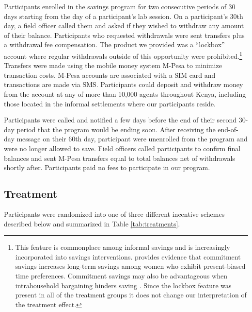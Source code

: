 \documentclass[12pt, titlepage]{article}
\begin{document}
		Participants enrolled in the savings program for two consecutive periods of 30 days starting from the day of a participant's lab session. On a participant's 30th day, a field officer called them and asked if they wished to withdraw any amount of their balance. Participants who requested withdrawals were sent transfers plus a withdrawal fee compensation. The product we provided was a ``lockbox'' account where regular withdrawals outside of this opportunity were prohibited.\footnote{This feature is commonplace among informal savings and is increasingly incorporated into savings interventions. \textcite{ashraf_tying_2006} provides evidence that commitment savings increases long-term savings among women who exhibit present-biased time preferences. Commitment savings may also be advantageous when intrahousehold bargaining hinders saving \parencite{banerjee_economic_2007,schaner_cost_2011}. Since the lockbox feature was present in all of the treatment groups it does not change our interpretation of the treatment effect.} Transfers were made using the mobile money system M-Pesa to minimize transaction costs. M-Pesa accounts are associated with a SIM card and transactions are made via SMS. Participants could deposit and withdraw money from the account at any of more than 10,000 agents throughout Kenya, including those located in the informal settlements where our participants reside.

		Participants were called and notified a few days before the end of their second 30-day period that the program would be ending soon. After receiving the end-of-day message on their 60th day, participant were unenrolled from the program and were no longer allowed to save. Field officers called participants to confirm final balances and sent M-Pesa transfers equal to total balances net of withdrawals shortly after. Participants paid no fees to participate in our program.

	\subsection{Treatment} \label{sec:treat}

		Participants were randomized into one of three different incentive schemes described below and summarized in Table \ref{tab:treatments}.
\end{document}
